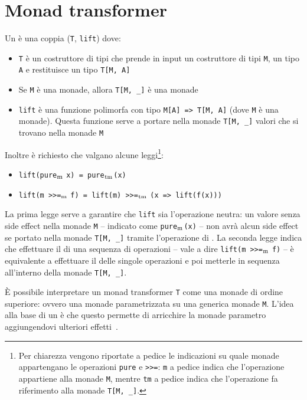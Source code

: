 \section{Monad transformer}

Un  è una coppia (\lstinline{T}, \lstinline{lift}) dove:
\begin{itemize}
  \item \lstinline{T} è un costruttore di tipi che prende in input un costruttore di tipi \lstinline{M}, un tipo \lstinline{A} e restituisce un tipo \lstinline{T[M, A]}
  \item Se \lstinline{M} è una monade, allora \lstinline{T[M, _]} è una monade
  \item \lstinline{lift} è una funzione polimorfa con tipo \lstinline{M[A] => T[M, A]} (dove \lstinline{M} è una monade). Questa funzione serve a portare nella monade \lstinline{T[M, _]} valori che si trovano nella monade \lstinline{M}
\end{itemize}

Inoltre è richiesto che valgano alcune leggi\footnote{Per chiarezza vengono riportate a pedice le indicazioni su quale monade appartengano le operazioni \lstinline{pure} e \lstinline{>>=}: \lstinline{m} a pedice indica che l'operazione appartiene alla monade \lstinline{M}, mentre \lstinline{tm} a pedice indica che l'operazione fa riferimento alla monade \lstinline{T[M, _]}.}:
\begin{itemize}
  \item \lstinline{lift(pure}$_\text{\lstinline{m}}$ \lstinline{x) = pure}$_\text{\lstinline{tm}}$\lstinline{(x)}
  \item \lstinline{lift(m >>=}$_\text{\lstinline{m}}$ \lstinline{f) = lift(m) >>=}$_\text{\lstinline{tm}}$ \lstinline{(x => lift(f(x)))}
\end{itemize}

La prima legge serve a garantire che \lstinline{lift} sia l'operazione neutra: un valore senza side effect nella monade \lstinline{M} -- indicato come \lstinline{pure}$_\text{\lstinline{m}}$\lstinline{(x)} -- non avrà alcun side effect se portato nella monade \lstinline{T[M, _]} tramite l'operazione di . La seconda legge indica che effettuare il  di una sequenza di operazioni -- vale a dire \lstinline{lift(m >>=}$_\text{\lstinline{m}}$ \lstinline{f)} -- è equivalente a effettuare il  delle singole operazioni e poi metterle in sequenza all'interno della monade \lstinline{T[M, _]}.

È possibile interpretare un monad transformer \lstinline{T} come una monade di ordine superiore: ovvero una monade parametrizzata su una generica monade \lstinline{M}. L'idea alla base di un  è che questo permette di arricchire la monade parametro aggiungendovi ulteriori effetti~\cite{cit:monad-transformers-and-modular-interpreters}.

